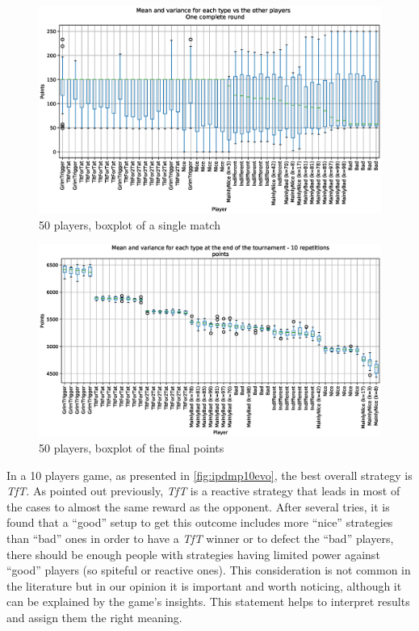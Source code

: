 \documentclass[journal,10pt,twoside]{IEEEtran}
\begin{document}
\begin{figure}[!ht]
    \centering
    \includegraphics[width=1\columnwidth]{../img/ipdmp/ipdmp-boxplot-single-match-50}
    \caption{50 players, boxplot of a single match}
    \label{fig:ipdmp50boxsingle}
\end{figure}

\begin{figure}[!ht]
    \centering
    \includegraphics[width=1\columnwidth]{../img/ipdmp/ipdmp-boxplot-final-points-50}
    \caption{50 players, boxplot of the final points}
    \label{fig:ipdmp50boxfinal}
\end{figure}

In a 10 players game, as presented in \autoref{fig:ipdmp10evo}, the best overall strategy is \textit{TfT}. As pointed out previously, \textit{TfT} is a reactive strategy that leads in most of the cases to almost the same reward as the opponent. After several tries, it is found that a ``good'' setup to get this outcome includes more ``nice'' strategies than ``bad'' ones in order to have a \textit{TfT} winner or to defect the ``bad'' players, there should be enough people with strategies having limited power against ``good'' players (so spiteful or reactive ones). This consideration is not common in the literature but in our opinion it is important and worth noticing, although it can be explained by the game's insights. This statement helps to interpret results and assign them the right meaning.
\end{document}
